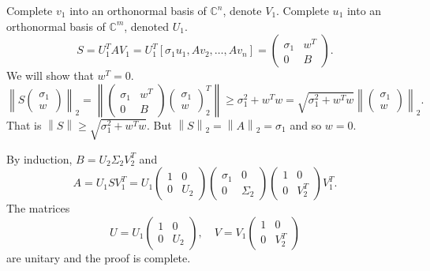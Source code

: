 \documentclass{article}
\newcommand{\norm}[1]{\left \lVert #1 \right \rVert}
\begin{document}
Complete $v_{1}$ into an orthonormal basis of $\mathbb{C}^{n}$,
denote $V_{1}$. Complete $u_{1}$ into an orthonormal basis of
$\mathbb{C}^{m}$, denoted $U_{1}$.
\begin{equation*}
S = U_{1}^{T} A V_{1}  = U_{1}^{T} \left [ \sigma_{1}u_{1} , A
v_{2}, \ldots, A v_{n}\right ] =
\begin{pmatrix}
\sigma_{1} & w^{T}  \\
0 & B
\end{pmatrix}.
\end{equation*}
We will show that $w^{T}=0$.
\begin{equation*}
\norm{S \begin{pmatrix} \sigma_{1} \\ w \end{pmatrix}}_{2} =  
\norm{
\begin{pmatrix}
\sigma_{1} & w^{T}  \\
0 & B
\end{pmatrix}
\begin{pmatrix}
\sigma_{1} \\ w
\end{pmatrix}
^{T}_{2}}
\ge \sigma_{1}^{2} + w^{T}w = \sqrt{\sigma_{1}^{2}+w^{T}w}
\norm{\begin{pmatrix} \sigma_{1} \\ w \end{pmatrix} }_{2}.
\end{equation*}
That is $\norm{S} \ge \sqrt{\sigma_{1}^{2} + w^{T}w}$. But
$\norm{S}_{2} = \norm{A}_{2}=\sigma_{1}$ and so $w=0$.

By induction, $B=U_{2}\Sigma_{2}V_{2}^{T}$ and
\begin{equation*}
A = U_{1}SV_{1}^{T} = U_{1}
\begin{pmatrix}
1 & 0 \\
0 & U_{2}
\end{pmatrix}
\begin{pmatrix}
\sigma_{1} & 0 \\
0 & \Sigma_{2}
\end{pmatrix}
\begin{pmatrix}
1 & 0 \\
0 & V_{2}^{T}
\end{pmatrix}
V_{1}^{T}.
\end{equation*}
The matrices
\begin{equation*}
U=U_{1}
\begin{pmatrix}
1 & 0 \\
0 & U_{2}
\end{pmatrix}, \quad
V=V_{1} \begin{pmatrix}
1 & 0 \\
0 & V_{2}^{T}
\end{pmatrix}
\end{equation*}
are unitary and the proof is complete.
\end{document}
